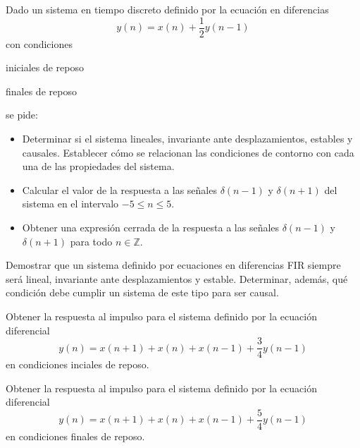 \begin{ejercicio}
    Dado un sistema en tiempo discreto definido por la ecuación en diferencias 
    \begin{equation*}
        y(n) = x(n) + \frac{1}{2} y(n-1)
    \end{equation*}
    con condiciones
    
    \inciso iniciales de reposo 

    \inciso finales de reposo

    \vspace*{1ex}

    \noindent se pide:
    \begin{itemize}
        \item Determinar si el sistema lineales, invariante ante desplazamientos, estables y causales. Establecer cómo se relacionan las condiciones de contorno con cada una de las propiedades del sistema.
        \item Calcular el valor de la respuesta a las señales $\delta(n-1)$ y $\delta(n+1)$ del sistema en el intervalo $-5 \leq n \leq 5$.
        \item Obtener una expresión cerrada de la respuesta a las señales $\delta(n-1)$ y $\delta(n+1)$ para todo $n \in \mathbb{Z}$.
    \end{itemize}
\end{ejercicio}
    
\begin{ejercicio}
    Demostrar que un sistema definido por ecuaciones en diferencias FIR siempre será lineal, invariante ante desplazamientos y estable. Determinar, además, qué condición debe cumplir un sistema de este tipo para ser causal.
\end{ejercicio}
    
\begin{ejercicio}
    Obtener la respuesta al impulso para el sistema definido por la ecuación diferencial 
    \begin{equation*}
        y(n) = x(n+1) + x(n) + x(n-1) + \frac{3}{4} y(n-1)
    \end{equation*}
    en condiciones inciales de reposo. 
\end{ejercicio}
    
\begin{ejercicio}
    Obtener la respuesta al impulso para el sistema definido por la ecuación diferencial 
    \begin{equation*}
        y(n) = x(n+1) + x(n) + x(n-1) + \frac{5}{4} y(n-1)
    \end{equation*}
    en condiciones finales de reposo. 
\end{ejercicio}
    
